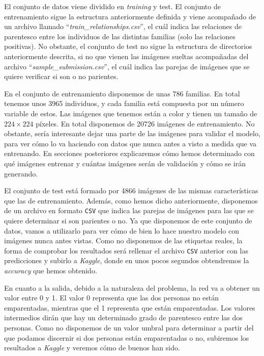 \documentclass[11pt,a4paper]{article}
\begin{document}
El conjunto de datos viene dividido en \textit{training} y test. El conjunto de entrenamiento sigue la estructura
anteriormente definida y viene acompañado de un archivo llamado ``\textit{train\_relationships.csv}'', el
cuál indica las relaciones de parentesco entre los individuos de las distintas familias (solo las relaciones
positivas). No obstante, el conjunto de test no sigue la estructura de directorios anteriormente descrita,
si no que vienen las imágenes sueltas acompañadas del archivo ``\textit{sample\_submission.csv}'', el cuál
indica las parejas de imágenes que se quiere verificar si son o no parientes.

En el conjunto de entrenamiento disponemos de unas 786 familias. En total tenemos unos 3965 individuos, y cada
familia está compuesta por un número variable de estos. Las imágenes que tenemos están a color y tienen un
tamaño de $224 \times 224$ píxeles. En total disponemos de 20726 imágenes de entrenamiento. No obstante, sería
interesante dejar una parte de las imágenes para validar el modelo, para ver cómo lo va haciendo con datos
que nunca antes a visto a medida que va entrenando. En secciones posteriores explicaremos cómo
hemos determinado con qué imágenes entrenar y cuántas imágenes serán de validación y cómo se irán generando.

El conjunto de test está formado por 4866 imágenes de las mismas características que las de entrenamiento.
Además, como hemos dicho anteriormente, disponemos de un archivo en formato \texttt{CSV} que indica
las parejas de imágenes para las que se quiere determinar si son parientes o no. Ya que disponemos de este
conjunto de datos, vamos a utilizarlo para ver cómo de bien lo hace nuestro modelo con imágenes nunca antes
vistas. Como no disponemos de las etiquetas reales, la forma de comprobar los resultados será rellenar el archivo
\texttt{CSV} anterior con las predicciones y subirlo a \textit{Kaggle}, donde en unos pocos segundos obtendremos
la \textit{accuracy} que hemos obtenido.

En cuanto a la salida, debido a la naturaleza del problema, la red va a obtener un valor entre 0 y 1.
El valor 0 representa que las dos personas no están emparentadas, mientras que el 1 representa que
están emparentadas. Los valores intermedios dirán que hay un determinado grado de parentesco entre
las dos personas. Como no disponemos de un valor umbral para determinar a partir del que podamos discernir
si dos personas están emparentadas o no, subiremos los resultados a \textit{Kaggle} y veremos cómo de buenos
han sido.
\end{document}
